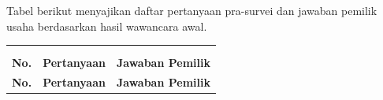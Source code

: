Tabel berikut menyajikan daftar pertanyaan pra-survei dan jawaban pemilik usaha berdasarkan hasil wawancara awal.

    {\scriptsize
        

\label{tab:wawancara_awal_pemilik}
        \edef\WawancaraAwalNomor{\thetable}
        \begin{xltabular}{\textwidth}{|>{\centering\arraybackslash}p{0.7cm}|p{4.4cm}|Y|}
            \multicolumn{3}{c}{\textbf{Tabel \WawancaraAwalNomor}}                                                                                                                                                                                                                                                                                                                                                                                                                                  \\
                                                                                                                                                                                                                                                                                                                                                                                                     \\[6pt]
            \toprule
            \textbf{No.} & \textbf{Pertanyaan}                                                                                                            & \textbf{Jawaban Pemilik}                                                                                                                                                                                                                                                                                                                      \\ \hline
            \midrule
            \endfirsthead
            \toprule
            \textbf{No.} & \textbf{Pertanyaan}                                                                                                            & \textbf{Jawaban Pemilik}                                                                                                                                                                                                                                                                                                                      \\ \hline

\end{xltabular}}
